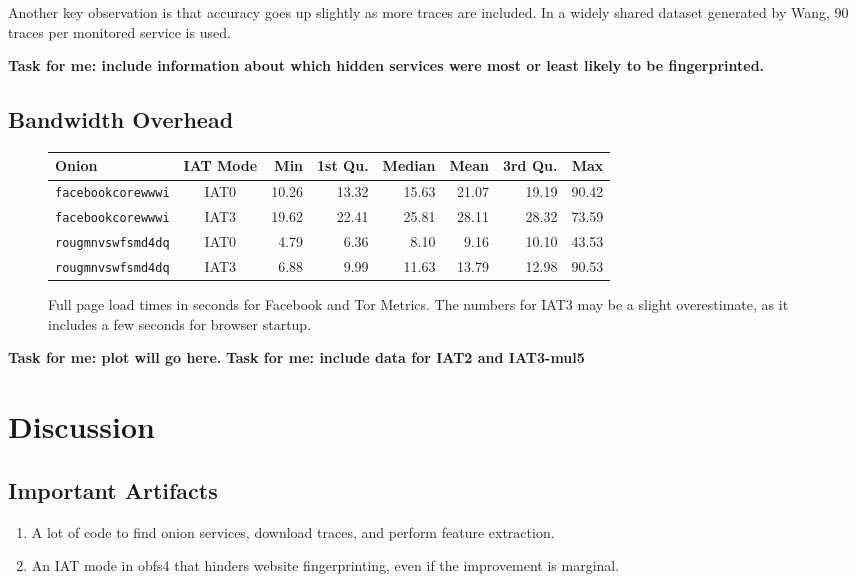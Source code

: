 \documentclass[11pt]{article}
\begin{document}
Another key observation is that accuracy goes up slightly as more traces are included. In a widely shared dataset generated by Wang\cite{wang}, 90 traces per monitored service is used.

\textbf{Task for me: include information about which hidden services were most or least likely to be fingerprinted.}

\subsection{Bandwidth Overhead}
\begin{figure}[h]
    \centering
    \begin{tabular}{|l|c||r|r|r|r|r|r|}
        \hline
        Onion & IAT Mode & Min & 1st Qu. & Median & Mean & 3rd Qu. & Max \\
        \hline
        \texttt{facebookcorewwwi} & IAT0 & 10.26 & 13.32 & 15.63 & 21.07 & 19.19 & 90.42 \\
        \texttt{facebookcorewwwi} & IAT3 & 19.62 & 22.41 & 25.81 & 28.11 & 28.32 & 73.59 \\
        \texttt{rougmnvswfsmd4dq} & IAT0 & 4.79 & 6.36 & 8.10 & 9.16 & 10.10 & 43.53 \\
        \texttt{rougmnvswfsmd4dq} & IAT3 & 6.88 & 9.99 & 11.63 & 13.79 & 12.98 & 90.53 \\
        \hline
    \end{tabular}
    \caption[]{Full page load times in seconds for Facebook and Tor Metrics. The numbers for IAT3 may be a slight overestimate, as it includes a few seconds for browser startup.\footnotemark}
\end{figure}



\textbf{Task for me: plot will go here.}
\textbf{Task for me: include data for IAT2 and IAT3-mul5}

\section{Discussion}
\subsection{Important Artifacts}
\begin{enumerate}
    \item A lot of code to find onion services, download traces, and perform feature extraction.
    \item An IAT mode in obfs4 that hinders website fingerprinting, even if the improvement is marginal.
\end{enumerate}
\end{document}
